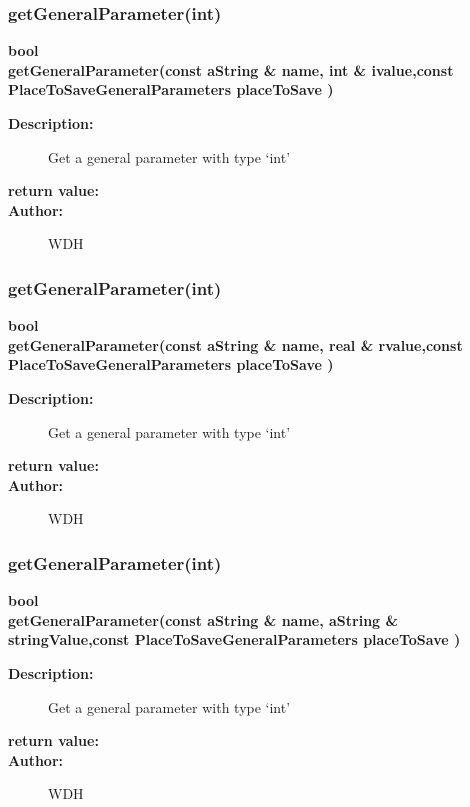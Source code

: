 \subsubsection{getGeneralParameter(int)}
 
\begin{flushleft} \textbf{%
bool  \\ 
\settowidth{\ShowFileReaderIncludeArgIndent}{getGeneralParameter(}%
getGeneralParameter(const aString \& name, int \& ivalue,const  PlaceToSaveGeneralParameters placeToSave ) 
}\end{flushleft}
\begin{description}
\item[{\bf Description:}] 
    Get a general parameter with type `int'
\item[{\bf return value:}]  
\item[{\bf Author:}]  WDH
\end{description}
\subsubsection{getGeneralParameter(int)}
 
\begin{flushleft} \textbf{%
bool  \\ 
\settowidth{\ShowFileReaderIncludeArgIndent}{getGeneralParameter(}%
getGeneralParameter(const aString \& name, real \& rvalue,const   PlaceToSaveGeneralParameters placeToSave ) 
}\end{flushleft}
\begin{description}
\item[{\bf Description:}] 
    Get a general parameter with type `int'
\item[{\bf return value:}]  
\item[{\bf Author:}]  WDH
\end{description}
\subsubsection{getGeneralParameter(int)}
 
\begin{flushleft} \textbf{%
bool  \\ 
\settowidth{\ShowFileReaderIncludeArgIndent}{getGeneralParameter(}%
getGeneralParameter(const aString \& name, aString \& stringValue,const  PlaceToSaveGeneralParameters placeToSave ) 
}\end{flushleft}
\begin{description}
\item[{\bf Description:}] 
    Get a general parameter with type `int'
\item[{\bf return value:}]  
\item[{\bf Author:}]  WDH
\end{description}
